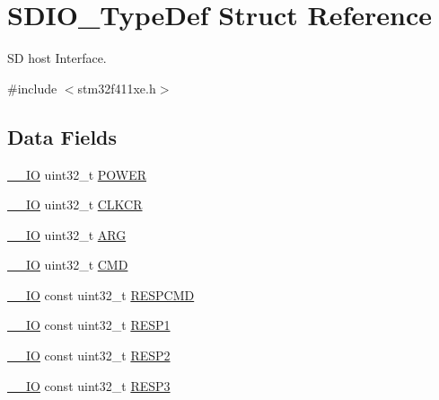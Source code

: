 \hypertarget{struct_s_d_i_o___type_def}{}\section{S\+D\+I\+O\+\_\+\+Type\+Def Struct Reference}
\label{struct_s_d_i_o___type_def}


SD host Interface.  




{\ttfamily \#include $<$stm32f411xe.\+h$>$}

\subsection*{Data Fields}
\begin{DoxyCompactItemize}
\item 
\hyperlink{core__sc300_8h_aec43007d9998a0a0e01faede4133d6be}{\+\_\+\+\_\+\+IO} uint32\+\_\+t \hyperlink{struct_s_d_i_o___type_def_a7c156bc55f6d970a846a459d57a9e940}{P\+O\+W\+ER}
\item 
\hyperlink{core__sc300_8h_aec43007d9998a0a0e01faede4133d6be}{\+\_\+\+\_\+\+IO} uint32\+\_\+t \hyperlink{struct_s_d_i_o___type_def_aeb1e30ce2038628e45264f75e5e926bb}{C\+L\+K\+CR}
\item 
\hyperlink{core__sc300_8h_aec43007d9998a0a0e01faede4133d6be}{\+\_\+\+\_\+\+IO} uint32\+\_\+t \hyperlink{struct_s_d_i_o___type_def_a3e24392875e98cd09043e54a0990ab7a}{A\+RG}
\item 
\hyperlink{core__sc300_8h_aec43007d9998a0a0e01faede4133d6be}{\+\_\+\+\_\+\+IO} uint32\+\_\+t \hyperlink{struct_s_d_i_o___type_def_abbbdc3174e12dab21123d746d65f345d}{C\+MD}
\item 
\hyperlink{core__sc300_8h_aec43007d9998a0a0e01faede4133d6be}{\+\_\+\+\_\+\+IO} const uint32\+\_\+t \hyperlink{struct_s_d_i_o___type_def_ad0076eec3f30c0279c193da7173af543}{R\+E\+S\+P\+C\+MD}
\item 
\hyperlink{core__sc300_8h_aec43007d9998a0a0e01faede4133d6be}{\+\_\+\+\_\+\+IO} const uint32\+\_\+t \hyperlink{struct_s_d_i_o___type_def_a53f4c92d9a06bfee520718c82f0027b1}{R\+E\+S\+P1}
\item 
\hyperlink{core__sc300_8h_aec43007d9998a0a0e01faede4133d6be}{\+\_\+\+\_\+\+IO} const uint32\+\_\+t \hyperlink{struct_s_d_i_o___type_def_af06e60089c11f9402d69a56aa828edda}{R\+E\+S\+P2}
\item 
\hyperlink{core__sc300_8h_aec43007d9998a0a0e01faede4133d6be}{\+\_\+\+\_\+\+IO} const uint32\+\_\+t \hyperlink{struct_s_d_i_o___type_def_a51c8a77f72757a2c17d38b61ff13f356}{R\+E\+S\+P3}

\end{DoxyCompactItemize}
